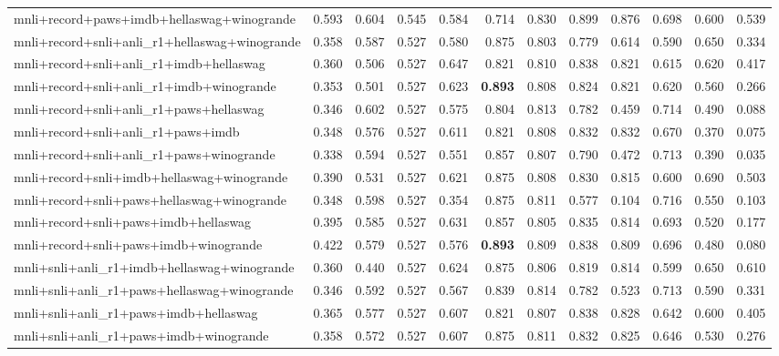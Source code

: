 \begin{table}[t]
\begin{tabular}{lrrrrrrrrrrr}
    mnli+record+paws+imdb+hellaswag+winogrande & 0.593 & 0.604 & 0.545 & 0.584 & 0.714 & 0.830 & 0.899 & 0.876 & 0.698 & 0.600 & 0.539 \\
    mnli+record+snli+anli\_r1+hellaswag+winogrande & 0.358 & 0.587 & 0.527 & 0.580 & 0.875 & 0.803 & 0.779 & 0.614 & 0.590 & 0.650 & 0.334 \\
    mnli+record+snli+anli\_r1+imdb+hellaswag & 0.360 & 0.506 & 0.527 & 0.647 & 0.821 & 0.810 & 0.838 & 0.821 & 0.615 & 0.620 & 0.417 \\
    mnli+record+snli+anli\_r1+imdb+winogrande & 0.353 & 0.501 & 0.527 & 0.623 & \textbf{0.893} & 0.808 & 0.824 & 0.821 & 0.620 & 0.560 & 0.266 \\
    mnli+record+snli+anli\_r1+paws+hellaswag & 0.346 & 0.602 & 0.527 & 0.575 & 0.804 & 0.813 & 0.782 & 0.459 & 0.714 & 0.490 & 0.088 \\
    mnli+record+snli+anli\_r1+paws+imdb & 0.348 & 0.576 & 0.527 & 0.611 & 0.821 & 0.808 & 0.832 & 0.832 & 0.670 & 0.370 & 0.075 \\
    mnli+record+snli+anli\_r1+paws+winogrande & 0.338 & 0.594 & 0.527 & 0.551 & 0.857 & 0.807 & 0.790 & 0.472 & 0.713 & 0.390 & 0.035 \\
    mnli+record+snli+imdb+hellaswag+winogrande & 0.390 & 0.531 & 0.527 & 0.621 & 0.875 & 0.808 & 0.830 & 0.815 & 0.600 & 0.690 & 0.503 \\
    mnli+record+snli+paws+hellaswag+winogrande & 0.348 & 0.598 & 0.527 & 0.354 & 0.875 & 0.811 & 0.577 & 0.104 & 0.716 & 0.550 & 0.103 \\
    mnli+record+snli+paws+imdb+hellaswag & 0.395 & 0.585 & 0.527 & 0.631 & 0.857 & 0.805 & 0.835 & 0.814 & 0.693 & 0.520 & 0.177 \\
    mnli+record+snli+paws+imdb+winogrande & 0.422 & 0.579 & 0.527 & 0.576 & \textbf{0.893} & 0.809 & 0.838 & 0.809 & 0.696 & 0.480 & 0.080 \\
    mnli+snli+anli\_r1+imdb+hellaswag+winogrande & 0.360 & 0.440 & 0.527 & 0.624 & 0.875 & 0.806 & 0.819 & 0.814 & 0.599 & 0.650 & 0.610 \\
    mnli+snli+anli\_r1+paws+hellaswag+winogrande & 0.346 & 0.592 & 0.527 & 0.567 & 0.839 & 0.814 & 0.782 & 0.523 & 0.713 & 0.590 & 0.331 \\
    mnli+snli+anli\_r1+paws+imdb+hellaswag & 0.365 & 0.577 & 0.527 & 0.607 & 0.821 & 0.807 & 0.838 & 0.828 & 0.642 & 0.600 & 0.405 \\
    mnli+snli+anli\_r1+paws+imdb+winogrande & 0.358 & 0.572 & 0.527 & 0.607 & 0.875 & 0.811 & 0.832 & 0.825 & 0.646 & 0.530 & 0.276 \\

\end{tabular}
\end{table}
